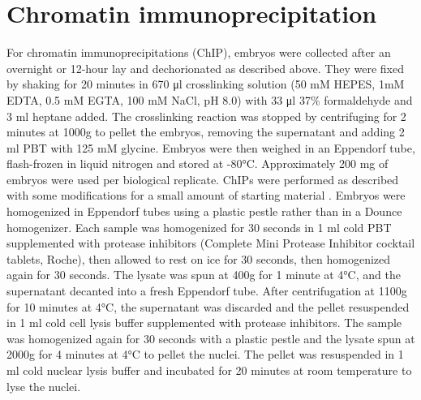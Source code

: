 \section{Chromatin immunoprecipitation}
For chromatin immunoprecipitations (ChIP), embryos were collected after an overnight or 12-hour lay and dechorionated as described above. They were fixed by shaking for 20 minutes in 670 μl crosslinking solution (50 mM HEPES, 1mM EDTA, 0.5 mM EGTA, 100 mM NaCl, pH 8.0) with 33 μl 37\% formaldehyde and 3 ml heptane added. The crosslinking reaction was stopped by centrifuging for 2 minutes at 1000g to pellet the embryos, removing the supernatant and adding 2 ml PBT with 125 mM glycine. Embryos were then weighed in an Eppendorf tube, flash-frozen in liquid nitrogen and stored at -80°C. Approximately 200 mg of embryos were used per biological replicate. ChIPs were performed as described with some modifications for a small amount of starting material \citep{ghavi-helm_analyzing_2012, sandmann_chip--chip_2007}. Embryos were homogenized in Eppendorf tubes using a plastic pestle rather than in a Dounce homogenizer. Each sample was homogenized for 30 seconds in 1 ml cold PBT supplemented with protease inhibitors (Complete Mini Protease Inhibitor cocktail tablets, Roche), then allowed to rest on ice for 30 seconds, then homogenized again for 30 seconds. The lysate was spun at 400g for 1 minute at 4°C, and the supernatant decanted into a fresh Eppendorf tube. After centrifugation at 1100g for 10 minutes at 4°C, the supernatant was discarded and the pellet resuspended in 1 ml cold cell lysis buffer supplemented with protease inhibitors. The sample was homogenized again for 30 seconds with a plastic pestle and the lysate spun at 2000g for 4 minutes at 4°C to pellet the nuclei. The pellet was resuspended in 1 ml cold nuclear lysis buffer and incubated for 20 minutes at room temperature to lyse the nuclei. 
